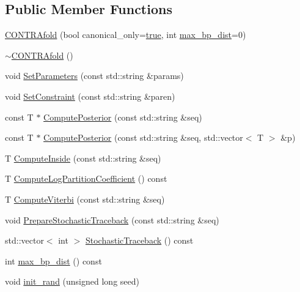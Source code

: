 \subsection*{Public Member Functions}
\begin{DoxyCompactItemize}
\item 
\hyperlink{class_c_o_n_t_r_afold_ab83a77022cefb1b447f57c6ea23d3c3b}{C\+O\+N\+T\+R\+Afold} (bool canonical\+\_\+only=\hyperlink{naview_8c_a41f9c5fb8b08eb5dc3edce4dcb37fee7}{true}, int \hyperlink{class_c_o_n_t_r_afold_a4cd8f0e5b42ac575ffc1f360bc27a963}{max\+\_\+bp\+\_\+dist}=0)
\item 
\hyperlink{class_c_o_n_t_r_afold_a5e4a90a78a8075dd6c669d86382b8d11}{$\sim$\+C\+O\+N\+T\+R\+Afold} ()
\item 
void \hyperlink{class_c_o_n_t_r_afold_af8a600b8a027da44534b16e0229d79cf}{Set\+Parameters} (const std\+::string \&params)
\item 
void \hyperlink{class_c_o_n_t_r_afold_a5d0d69ae72d4c928c2f0313eaed6ce00}{Set\+Constraint} (const std\+::string \&paren)
\item 
const T $\ast$ \hyperlink{class_c_o_n_t_r_afold_aceffa898e7a022f7e69d4564b6f3dea3}{Compute\+Posterior} (const std\+::string \&seq)
\item 
const T $\ast$ \hyperlink{class_c_o_n_t_r_afold_a5149ede490256e49b3d834670d323510}{Compute\+Posterior} (const std\+::string \&seq, std\+::vector$<$ T $>$ \&p)
\item 
T \hyperlink{class_c_o_n_t_r_afold_ad4f8ceaf30fbbef67dd49bc669ea3b8a}{Compute\+Inside} (const std\+::string \&seq)
\item 
T \hyperlink{class_c_o_n_t_r_afold_a2a4b769fb11ce06fe98362fd7875ac67}{Compute\+Log\+Partition\+Coefficient} () const 
\item 
T \hyperlink{class_c_o_n_t_r_afold_aa802871684214b6283c7a6c28d6a1279}{Compute\+Viterbi} (const std\+::string \&seq)
\item 
void \hyperlink{class_c_o_n_t_r_afold_a18d1d6fb3a0cf52c4e382a9e8e22c811}{Prepare\+Stochastic\+Traceback} (const std\+::string \&seq)
\item 
std\+::vector$<$ int $>$ \hyperlink{class_c_o_n_t_r_afold_a069969c68122c7e050b5c9b8f2ec07ff}{Stochastic\+Traceback} () const 
\item 
int \hyperlink{class_c_o_n_t_r_afold_a4cd8f0e5b42ac575ffc1f360bc27a963}{max\+\_\+bp\+\_\+dist} () const 
\item 
void \hyperlink{class_c_o_n_t_r_afold_a8ccf12e145cbe362f4363e6ecf351542}{init\+\_\+rand} (unsigned long seed)
\end{DoxyCompactItemize}


